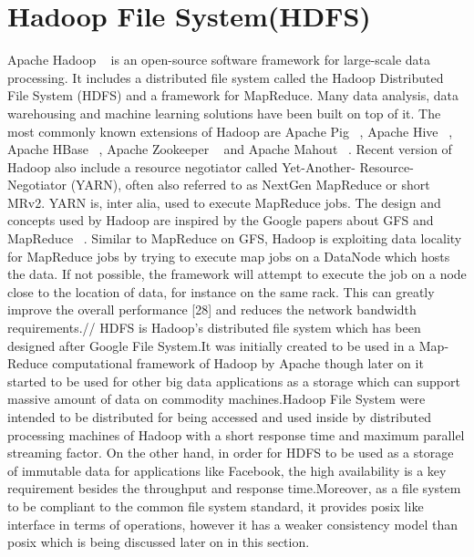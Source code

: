 \section{Hadoop File System(HDFS)}
Apache Hadoop ~\cite{h17} is an open-source software framework for large-scale data
processing. It includes a distributed file system called the Hadoop Distributed
File System (HDFS) and a framework for MapReduce. Many data analysis,
data warehousing and machine learning solutions have been built on top of it.
The most commonly known extensions of Hadoop are Apache Pig ~\cite{21}, Apache
Hive ~\cite{22}, Apache HBase  ~\cite{26}, Apache Zookeeper  ~\cite{27} and Apache Mahout  ~\cite{23}.
Recent version of Hadoop also include a resource negotiator called Yet-Another-
Resource-Negotiator (YARN), often also referred to as NextGen MapReduce or
short MRv2. YARN is, inter alia, used to execute MapReduce jobs. The design
and concepts used by Hadoop are inspired by the Google papers about GFS and
MapReduce ~\cite[p.~9]{h17}. Similar to MapReduce on GFS, Hadoop is exploiting data
locality for MapReduce jobs by trying to execute map jobs on a DataNode which
hosts the data. If not possible, the framework will attempt to execute the job
on a node close to the location of data, for instance on the same rack. This can
greatly improve the overall performance [28] and reduces the network bandwidth
requirements.//
 HDFS  is   Hadoop’s   distributed  file  system   which  has   been  designed  after  Google  File System.It was initially created to be used in a Map-Reduce computational framework of Hadoop by Apache though later on it started to be used for other big data applications as a storage which can support massive amount of data on commodity machines.Hadoop File System were intended to be distributed for being accessed and used inside by distributed processing machines of Hadoop with a short response time and maximum parallel streaming factor. On the other hand, in order for HDFS to be used as a storage of immutable data for applications like Facebook, the high availability is a key requirement besides the throughput and response time.Moreover, as a file system to be compliant to the common file system standard, it provides posix like interface in terms of operations, however it has a weaker consistency model than posix which is being discussed later on in this section.
